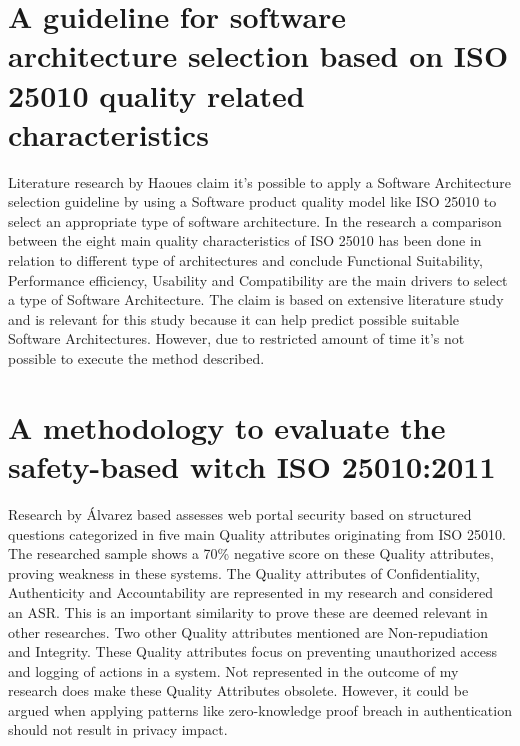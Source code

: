 \section*{A guideline for software architecture selection based on ISO 25010 quality related characteristics}
Literature research by Haoues \etal \cite{Haoues2017AGF} claim it's possible to apply a Software Architecture selection guideline by using a Software product quality model like ISO 25010 to select an appropriate type of software architecture. In the research a comparison between the eight main quality characteristics of ISO 25010 has been done in relation to different type of architectures and conclude Functional Suitability, Performance efficiency, Usability and Compatibility are the main drivers to select a type of Software Architecture. The claim is based on extensive literature study and is relevant for this study because it can help predict possible suitable Software Architectures. However, due to restricted amount of time it's not possible to execute the method described. 

\section*{A methodology to evaluate the safety-based witch ISO 25010:2011}
Research by {\'A}lvarez \etal \cite{Mexlvarez2021AMT} based assesses web portal security based on structured questions categorized in five main Quality attributes originating from ISO 25010. The researched sample shows a 70\% negative score on these Quality attributes, proving weakness in these systems. The Quality attributes of Confidentiality, Authenticity and Accountability are represented in my research and considered an ASR. This is an important similarity to prove these are deemed relevant in other researches. Two other Quality attributes mentioned are Non-repudiation and Integrity. These Quality attributes focus on preventing unauthorized access and logging of actions in a system. Not represented in the outcome of my research does make these Quality Attributes obsolete. However, it could be argued when applying patterns like zero-knowledge proof breach in authentication should not result in privacy impact.